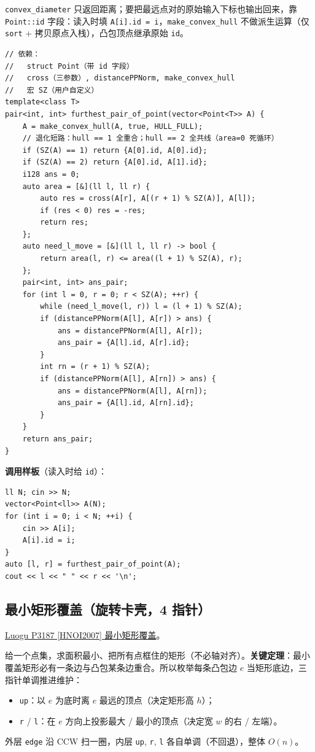 		\texttt{convex\_diameter} 只返回距离；要把最远点对的原始输入下标也输出回来，靠 \texttt{Point::id} 字段：读入时填 \texttt{A[i].id = i}，\texttt{make\_convex\_hull} 不做派生运算（仅 \texttt{sort} + 拷贝原点入栈），凸包顶点继承原始 \texttt{id}。

		\begin{verbatim}
// 依赖：
//   struct Point（带 id 字段）
//   cross（三参数）, distancePPNorm, make_convex_hull
//   宏 SZ（用户自定义）
template<class T>
pair<int, int> furthest_pair_of_point(vector<Point<T>> A) {
	A = make_convex_hull(A, true, HULL_FULL);
	// 退化短路：hull == 1 全重合；hull == 2 全共线（area=0 死循环）
	if (SZ(A) == 1) return {A[0].id, A[0].id};
	if (SZ(A) == 2) return {A[0].id, A[1].id};
	i128 ans = 0;
	auto area = [&](ll l, ll r) {
		auto res = cross(A[r], A[(r + 1) % SZ(A)], A[l]);
		if (res < 0) res = -res;
		return res;
	};
	auto need_l_move = [&](ll l, ll r) -> bool {
		return area(l, r) <= area((l + 1) % SZ(A), r);
	};
	pair<int, int> ans_pair;
	for (int l = 0, r = 0; r < SZ(A); ++r) {
		while (need_l_move(l, r)) l = (l + 1) % SZ(A);
		if (distancePPNorm(A[l], A[r]) > ans) {
			ans = distancePPNorm(A[l], A[r]);
			ans_pair = {A[l].id, A[r].id};
		}
		int rn = (r + 1) % SZ(A);
		if (distancePPNorm(A[l], A[rn]) > ans) {
			ans = distancePPNorm(A[l], A[rn]);
			ans_pair = {A[l].id, A[rn].id};
		}
	}
	return ans_pair;
}
		\end{verbatim}

		\textbf{调用样板}（读入时给 \texttt{id}）：
		\begin{verbatim}
ll N; cin >> N;
vector<Point<ll>> A(N);
for (int i = 0; i < N; ++i) {
	cin >> A[i];
	A[i].id = i;
}
auto [l, r] = furthest_pair_of_point(A);
cout << l << " " << r << '\n';
		\end{verbatim}

		\subsection{最小矩形覆盖（旋转卡壳，4 指针）}

		\href{https://vjudge.net/problem/Luogu-P3187}{Luogu P3187 [HNOI2007] 最小矩形覆盖}。

		给一个点集，求面积最小、把所有点框住的矩形（不必轴对齐）。\textbf{关键定理}：最小覆盖矩形必有一条边与凸包某条边重合。所以枚举每条凸包边 $e$ 当矩形底边，三指针单调推进维护：
		\begin{itemize}
				\setlength\itemsep{0pt}
			\item \texttt{up}：以 $e$ 为底时离 $e$ 最远的顶点（决定矩形高 $h$）；
			\item \texttt{r} / \texttt{l}：在 $e$ 方向上投影最大 / 最小的顶点（决定宽 $w$ 的右 / 左端）。
		\end{itemize}
		外层 \texttt{edge} 沿 CCW 扫一圈，内层 \texttt{up}, \texttt{r}, \texttt{l} 各自单调（不回退），整体 $O(n)$。

